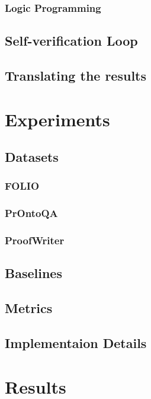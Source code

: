 \documentclass[conference]{IEEEtran}
\begin{document}
\subsubsection*{Logic Programming}

\subsection{Self-verification Loop}

\subsection{Translating the results}

\section{Experiments}
\subsection{Datasets}

\subsubsection*{FOLIO}
\subsubsection*{PrOntoQA}
\subsubsection*{ProofWriter}


\subsection{Baselines}

\subsection{Metrics}

\subsection{Implementaion Details}

\section{Results}
\end{document}
